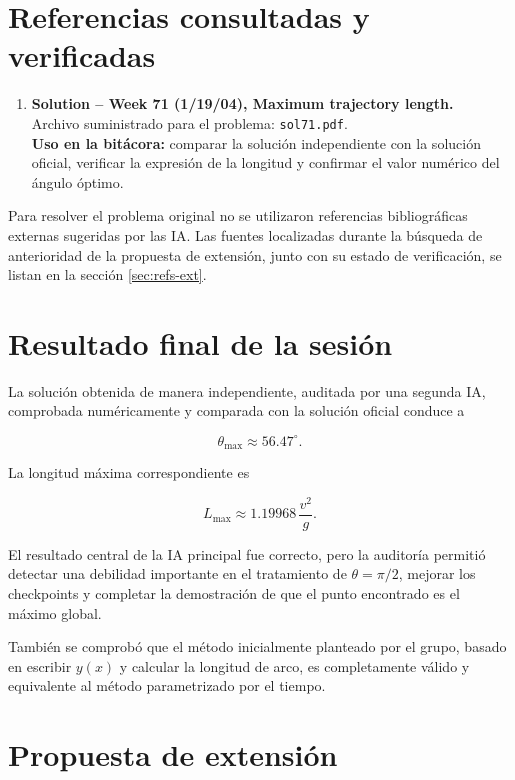 \section{Referencias consultadas y verificadas}

\begin{enumerate}
    \item \textbf{Solution -- Week 71 (1/19/04), Maximum trajectory length.}\\
    Archivo suministrado para el problema: \texttt{sol71.pdf}.\\
    \textbf{Uso en la bitácora:} comparar la solución independiente con la solución oficial, verificar la expresión de la longitud y confirmar el valor numérico del ángulo óptimo.
\end{enumerate}

Para resolver el problema original no se utilizaron referencias bibliográficas externas sugeridas por las IA. Las fuentes localizadas durante la búsqueda de anterioridad de la propuesta de extensión, junto con su estado de verificación, se listan en la sección \ref{sec:refs-ext}.

\section{Resultado final de la sesión}

La solución obtenida de manera independiente, auditada por una segunda IA, comprobada numéricamente y comparada con la solución oficial conduce a

\[
\boxed{
\theta_{\max}
\approx
56.47^\circ
}.
\]

La longitud máxima correspondiente es

\[
\boxed{
L_{\max}
\approx
1.19968\,\frac{v^2}{g}
}.
\]

El resultado central de la IA principal fue correcto, pero la auditoría permitió detectar una debilidad importante en el tratamiento de \(\theta=\pi/2\), mejorar los checkpoints y completar la demostración de que el punto encontrado es el máximo global.

También se comprobó que el método inicialmente planteado por el grupo, basado en escribir \(y(x)\) y calcular la longitud de arco, es completamente válido y equivalente al método parametrizado por el tiempo.

\section{Propuesta de extensión}

